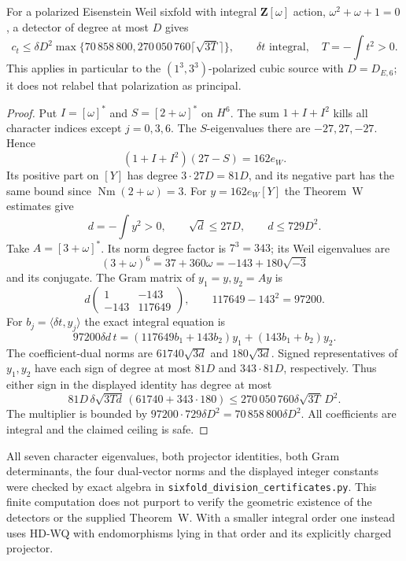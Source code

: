 \begin{theorem}
\label{SF-07}
For a polarized Eisenstein Weil sixfold with integral
$\mathbf Z[\omega]$ action, $\omega^2+\omega+1=0$, a detector of
degree at most $D$ gives
\[
 c_t\le\delta D^2\max\{70\,858\,800,
          270\,050\,760\lceil\sqrt{3T}\rceil\},
 \qquad \delta t\text{ integral},\quad T=-\int t^2>0.
\]
This applies in particular to the $(1^3,3^3)$-polarized cubic source
with $D=D_{E,6}$; it does not relabel that polarization as principal.
\end{theorem}
\begin{proof}
Put $I=[\omega]^*$ and $S=[2+\omega]^*$ on $H^6$. The sum
$1+I+I^2$ kills all character indices except $j=0,3,6$.
The $S$-eigenvalues there are $-27,27,-27$. Hence
\[
 (1+I+I^2)(27-S)=162e_W.
\]
Its positive part on $[Y]$ has degree $3\cdot27D=81D$, and
its negative part has the same bound since $\operatorname{Nm}(2+\omega)=3$.
For $y=162e_W[Y]$ the Theorem~W estimates give
\[
 d=-\int y^2>0,\qquad \sqrt d\le27D,\qquad d\le729D^2.
\]
Take $A=[3+\omega]^*$. Its norm degree factor is $7^3=343$;
its Weil eigenvalues are
\[
 (3+\omega)^6=37+360\omega=-143+180\sqrt{-3}
\]
and its conjugate. The Gram matrix of $y_1=y,y_2=Ay$ is
\[
 d\begin{pmatrix}1&-143\\-143&117649\end{pmatrix},
 \qquad117649-143^2=97200.
\]
For $b_j=\langle\delta t,y_j\rangle$ the exact integral equation is
\[
 97200\delta d\,t=(117649b_1+143b_2)y_1+(143b_1+b_2)y_2.
\]
The coefficient-dual norms are $61740\sqrt{3d}$ and
$180\sqrt{3d}$. Signed representatives of $y_1,y_2$ have each
sign of degree at most $81D$ and $343\cdot81D$, respectively.
Thus either sign in the displayed identity has degree at most
\[
 81D\,\delta\sqrt{3Td}\,(61740+343\cdot180)
 \le270\,050\,760\delta\sqrt{3T}\,D^2.
\]
The multiplier is bounded by
$97200\cdot729\delta D^2=70\,858\,800\delta D^2$.
All coefficients are integral and the claimed ceiling is safe.
\end{proof}
All seven character eigenvalues, both projector identities, both
Gram determinants, the four dual-vector norms and the displayed
integer constants were checked by exact algebra in
\texttt{sixfold\_division\_certificates.py}. This finite computation
does not purport to verify the geometric existence of the detectors
or the supplied Theorem~W. With a smaller integral order one instead
uses HD-WQ with endomorphisms lying in that order and its explicitly
charged projector.

